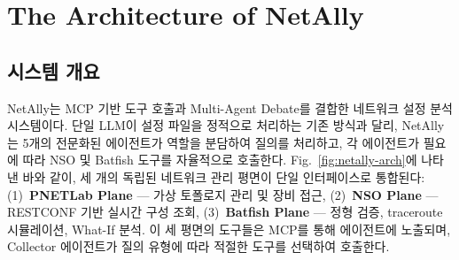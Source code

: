 




\section{The Architecture of NetAlly}

\subsection{시스템 개요}

NetAlly는 MCP 기반 도구 호출과 Multi-Agent Debate를 결합한
네트워크 설정 분석 시스템이다.
단일 LLM이 설정 파일을 정적으로 처리하는 기존 방식과 달리,
NetAlly는 5개의 전문화된 에이전트가 역할을 분담하여 질의를 처리하고,
각 에이전트가 필요에 따라 NSO 및 Batfish 도구를 자율적으로 호출한다.
Fig.~\ref{fig:netally-arch}에 나타낸 바와 같이,
세 개의 독립된 네트워크 관리 평면이 단일 인터페이스로 통합된다:
(1)~\textbf{PNETLab Plane} --- 가상 토폴로지 관리 및 장비 접근,
(2)~\textbf{NSO Plane} --- RESTCONF 기반 실시간 구성 조회,
(3)~\textbf{Batfish Plane} --- 정형 검증, traceroute 시뮬레이션, What-If 분석.
이 세 평면의 도구들은 MCP를 통해 에이전트에 노출되며, Collector 에이전트가 질의 유형에 따라 적절한 도구를 선택하여 호출한다. 



